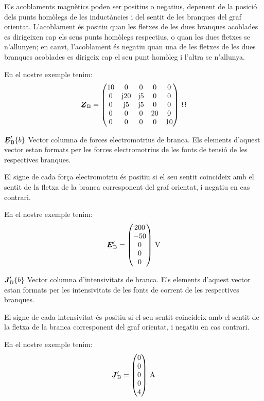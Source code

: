 \begin{list}{}
   Els acoblaments magnètics poden ser positius o negatius, depenent
    de la posició dels punts homòlegs de les inductàncies i del sentit
    de les branques del graf orientat. L'acoblament és positiu quan les
    fletxes de les dues branques acoblades es dirigeixen cap els seus punts
    homòlegs respectius, o quan les dues fletxes se n'allunyen; en canvi,
    l'acoblament és negatiu quan una de les fletxes de les dues branques
    acoblades es dirigeix cap el seu punt homòleg i l'altra se n'allunya.

   En el nostre exemple tenim:
   \[
      \mcmplx{Z}\ped{B} = \begin{pmatrix}
            10 & 0 & 0 & 0 & 0 \\
            0 & \ju 20 & \ju 5 & 0 & 0 \\
            0 & \ju 5 & \ju 5 & 0 & 0 \\
            0 & 0 & 0 & 20 & 0 \\
            0 & 0 & 0 & 0 & 10
      \end{pmatrix}\si{\,\ohm}
   \]

   \item[$\mcmplx{E}'\ped{B}\{b\}$] Vector columna de forces electromotrius de branca. Els elements d'aquest vector estan formats per les forces electromotrius de les fonts de tensió de les respectives branques.

El signe de cada força electromotriu és positiu si el seu sentit coincideix amb el sentit de la fletxa de la branca corresponent del graf orientat, i negatiu en cas contrari.

   En el nostre exemple tenim:
   \[
      \mcmplx{E}'\ped{B} = \begin{pmatrix} 200 \\ -50 \\ 0 \\ 0 \\ 0 \end{pmatrix}\si{\,V}
   \]

   \item[$\mcmplx{J}'\ped{B}\{b\}$] Vector columna d'intensivitats de branca. Els elements d'aquest vector estan formats per les intensivitats de les fonts de corrent de les respectives branques.

El signe de cada intensivitat és positiu si el seu sentit coincideix amb el sentit de la fletxa de la branca corresponent del graf orientat, i negatiu en cas contrari.

   En el nostre exemple tenim:
   \[
      \mcmplx{J}'\ped{B} = \begin{pmatrix} 0 \\ 0 \\ 0 \\ 0 \\ 4 \end{pmatrix}\si{\,A}
   \]

\end{list}

